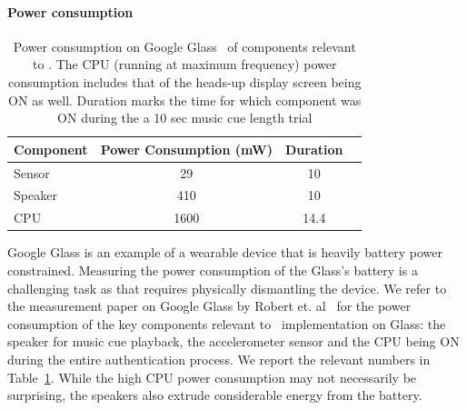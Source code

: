 \paragraph{Power consumption}

\begin{table}
\begin{tabular}{lccc}
\hline
Component    & Power Consumption (mW) & Duration       \\ \hline\hline
Sensor  & 29                    & 10       \\
Speaker & 410                    & 10      \\
CPU      & 1600                   & 14.4 \\ \hline
\end{tabular}
\caption{\label{tab:pow}Power consumption on Google Glass~\cite{likamwa2014draining} of components relevant to 
\systemname.  The CPU (running at 
maximum frequency) power consumption includes that of the heads-up display 
screen being ON as well. Duration marks the time for which
component was ON during the a 10 sec music cue length trial}
\end{table}

Google Glass is an example of a wearable device that is heavily battery power 
constrained. Measuring the power consumption of the Glass's battery is a 
challenging task as that requires physically dismantling the device. 
We refer to the measurement paper on Google Glass by Robert et. 
al~\cite{LiKamWa:2014:DOG:2637166.2637230} for the power consumption of the 
key components relevant to \systemname~implementation on Glass: the speaker 
for music cue playback, the accelerometer sensor and the CPU being ON during 
the entire authentication process. We report the relevant numbers in 
Table~\ref{tab:pow}. While the high CPU power consumption may not necessarily 
be surprising, the speakers also extrude considerable energy from the battery. 
\fi

